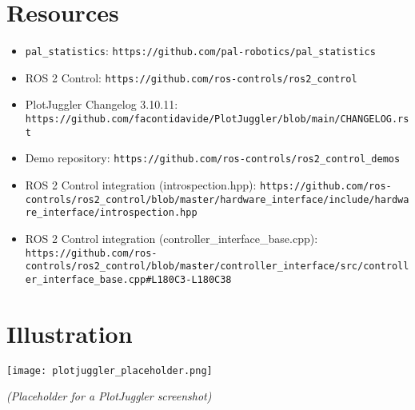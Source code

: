 \documentclass[11pt,a4paper]{article}
\begin{document}
\section*{Resources}
\begin{itemize}
    \item \texttt{pal\_statistics}: \texttt{https://github.com/pal-robotics/pal\_statistics}
    \item ROS 2 Control: \texttt{https://github.com/ros-controls/ros2\_control}
    \item PlotJuggler Changelog 3.10.11: \texttt{https://github.com/facontidavide/PlotJuggler/blob/main/CHANGELOG.rst}
    \item Demo repository: \texttt{https://github.com/ros-controls/ros2\_control_demos}
    \item ROS 2 Control integration (introspection.hpp): \texttt{https://github.com/ros-controls/ros2\_control/blob/master/hardware\_interface/include/hardware\_interface/introspection.hpp}
    \item ROS 2 Control integration (controller\_interface\_base.cpp): \texttt{https://github.com/ros-controls/ros2\_control/blob/master/controller_interface/src/controller_interface_base.cpp\#L180C3-L180C38}
\end{itemize}

\section*{Illustration}
\begin{center}
\texttt{[image: plotjuggler\_placeholder.png]}
\end{center}
\textit{(Placeholder for a PlotJuggler screenshot)}
\end{document}
